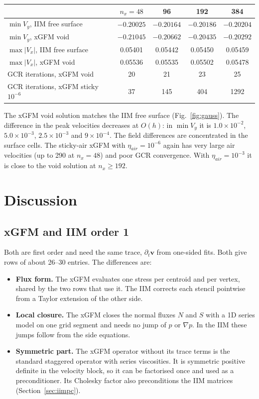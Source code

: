 \documentclass[11pt,a4paper]{article}
\begin{document}
\begin{center}
\begin{tabular}{lcccc}
\toprule
& $n_x=48$ & 96 & 192 & 384\\
\midrule
$\min V_y$, IIM free surface & $-0.20025$ & $-0.20164$ & $-0.20186$ & $-0.20204$\\
$\min V_y$, xGFM void        & $-0.21045$ & $-0.20662$ & $-0.20435$ & $-0.20292$\\
$\max|V_x|$, IIM free surface & 0.05401 & 0.05442 & 0.05450 & 0.05459\\
$\max|V_x|$, xGFM void        & 0.05536 & 0.05535 & 0.05502 & 0.05478\\
GCR iterations, xGFM void     & 20 & 21 & 23 & 25\\
GCR iterations, xGFM sticky $10^{-6}$ & 37 & 145 & 404 & 1292\\
\bottomrule
\end{tabular}
\end{center}

\noindent The xGFM void solution matches the IIM free surface (Fig.~\ref{fig:gauss}). The
difference in the peak velocities decreases at $O(h)$: in $\min V_y$ it is $1.0\times10^{-2}$,
$5.0\times10^{-3}$, $2.5\times10^{-3}$ and $9\times10^{-4}$. The field differences are
concentrated in the surface cells. The sticky-air xGFM with $\eta_{air}=10^{-6}$ again has
very large air velocities (up to 290 at $n_x=48$) and poor GCR convergence. With
$\eta_{air}=10^{-3}$ it is close to the void solution at $n_x\ge192$.

\section{Discussion}\label{sec:discussion}

\subsection*{xGFM and IIM order 1}

Both are first order and need the same trace, $\partial_t\mathbf v$ from one-sided fits. Both
give rows of about 26--30 entries. The differences are:
\begin{itemize}
  \item \textbf{Flux form.} The xGFM evaluates one stress per centroid and per vertex, shared by
    the two rows that use it. The IIM corrects each stencil pointwise from a Taylor extension of
    the other side.
  \item \textbf{Local closure.} The xGFM closes the normal fluxes $N$ and $S$ with a 1D series
    model on one grid segment and needs no jump of $p$ or $\nabla p$. In the IIM these jumps
    follow from the side equations.
  \item \textbf{Symmetric part.} The xGFM operator without its trace terms is the standard
    staggered operator with series viscosities. It is symmetric positive definite in the
    velocity block, so it can be factorised once and used as a preconditioner. Its Cholesky
    factor also preconditions the IIM matrices (Section~\ref{sec:iimpc}).
\end{itemize}
\end{document}
